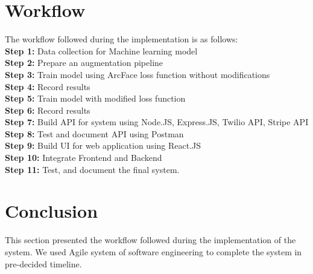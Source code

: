 \section{Workflow}
The workflow followed during the implementation is as follows:\\
\textbf{Step 1:} Data collection for Machine learning model\\
\textbf{Step 2:} Prepare an augmentation pipeline\\
\textbf{Step 3:} Train model using ArcFace loss function without modifications\\
\textbf{Step 4:} Record results\\
\textbf{Step 5:} Train model with modified loss function\\
\textbf{Step 6:} Record results\\
\textbf{Step 7:} Build API for system using Node.JS, Express.JS, Twilio API, Stripe API\\
\textbf{Step 8:} Test and document API using Postman\\
\textbf{Step 9:} Build UI for web application using React.JS\\
\textbf{Step 10:} Integrate Frontend and Backend\\
\textbf{Step 11:} Test, and document the final system.

\section{Conclusion}
This section presented the workflow followed during the implementation of the system. We used Agile system of software engineering to complete the system in pre-decided timeline.
